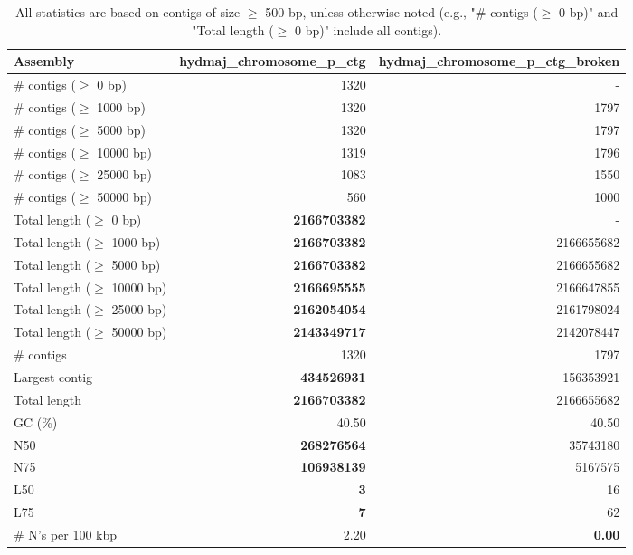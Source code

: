 \documentclass[12pt,a4paper]{article}
\begin{document}
\begin{table}[ht]
\begin{center}
\caption{All statistics are based on contigs of size $\geq$ 500 bp, unless otherwise noted (e.g., "\# contigs ($\geq$ 0 bp)" and "Total length ($\geq$ 0 bp)" include all contigs).}
\begin{tabular}{|l*{2}{|r}|}
\hline
Assembly & hydmaj\_chromosome\_p\_ctg & hydmaj\_chromosome\_p\_ctg\_broken \\ \hline
\# contigs ($\geq$ 0 bp) & 1320 & - \\ \hline
\# contigs ($\geq$ 1000 bp) & 1320 & 1797 \\ \hline
\# contigs ($\geq$ 5000 bp) & 1320 & 1797 \\ \hline
\# contigs ($\geq$ 10000 bp) & 1319 & 1796 \\ \hline
\# contigs ($\geq$ 25000 bp) & 1083 & 1550 \\ \hline
\# contigs ($\geq$ 50000 bp) & 560 & 1000 \\ \hline
Total length ($\geq$ 0 bp) & {\bf 2166703382} & - \\ \hline
Total length ($\geq$ 1000 bp) & {\bf 2166703382} & 2166655682 \\ \hline
Total length ($\geq$ 5000 bp) & {\bf 2166703382} & 2166655682 \\ \hline
Total length ($\geq$ 10000 bp) & {\bf 2166695555} & 2166647855 \\ \hline
Total length ($\geq$ 25000 bp) & {\bf 2162054054} & 2161798024 \\ \hline
Total length ($\geq$ 50000 bp) & {\bf 2143349717} & 2142078447 \\ \hline
\# contigs & 1320 & 1797 \\ \hline
Largest contig & {\bf 434526931} & 156353921 \\ \hline
Total length & {\bf 2166703382} & 2166655682 \\ \hline
GC (\%) & 40.50 & 40.50 \\ \hline
N50 & {\bf 268276564} & 35743180 \\ \hline
N75 & {\bf 106938139} & 5167575 \\ \hline
L50 & {\bf 3} & 16 \\ \hline
L75 & {\bf 7} & 62 \\ \hline
\# N's per 100 kbp & 2.20 & {\bf 0.00} \\ \hline
\end{tabular}
\end{center}
\end{table}
\end{document}
